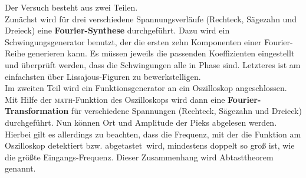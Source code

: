 Der Versuch besteht aus zwei Teilen. \\
Zunächst wird für drei verschiedene Spannungsverläufe (Rechteck, Sägezahn und Dreieck) eine \textbf{Fourier-Synthese} durchgeführt. Dazu wird ein Schwingungsgenerator benutzt, der die ersten zehn Komponenten einer Fourier-Reihe generieren kann. Es müssen jeweils die passenden Koeffizienten eingestellt und überprüft werden, dass die Schwingungen alle in Phase sind. Letzteres ist am einfachsten über Lissajous-Figuren zu bewerkstelligen. \\
Im zweiten Teil wird ein Funktionsgenerator an ein Oszilloskop angeschlossen. Mit Hilfe der \textsc{math}-Funktion des Oszilloskops wird dann eine \textbf{Fourier-Transformation} für verschiedene Spannungen (Rechteck, Sägezahn und Dreieck) durchgeführt. Nun können Ort und Amplitude der Pieks abgelesen werden. Hierbei gilt es allerdings zu beachten, dass die Frequenz, mit der die Funktion am Oszilloskop detektiert bzw. \glqq abgetastet\grqq\ wird, mindestens doppelt so groß ist, wie die größte Eingangs-Frequenz. Dieser Zusammenhang wird Abtasttheorem genannt.